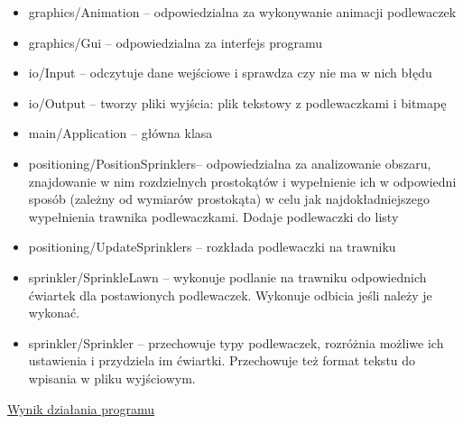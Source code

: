 \documentclass[12pt]{article}
\renewcommand{\_}{\kern-1.5pt\textunderscore\kern-1.5pt}
\begin{document}
\begin{itemize}
	\item graphics/Animation – odpowiedzialna za wykonywanie animacji podlewaczek\par

	\item graphics/Gui – odpowiedzialna za interfejs programu\par

	\item io/Input – odczytuje dane wejściowe i sprawdza czy nie ma w nich błędu\par

	\item io/Output – tworzy pliki wyjścia: plik tekstowy z podlewaczkami i bitmapę\par

	\item main/Application – główna klasa
\end{itemize}\par

\begin{itemize}
	\item positioning/PositionSprinklers– odpowiedzialna za analizowanie obszaru, znajdowanie w nim rozdzielnych prostokątów i wypełnienie ich w odpowiedni sposób (zależny od wymiarów prostokąta) w celu jak najdokładniejszego wypełnienia trawnika podlewaczkami. Dodaje podlewaczki do listy\par

	\item positioning/UpdateSprinklers – rozkłada podlewaczki na trawniku\par

	\item sprinkler/SprinkleLawn – wykonuje podlanie na trawniku odpowiednich ćwiartek dla postawionych podlewaczek. Wykonuje odbicia jeśli należy je wykonać.\par

	\item sprinkler/Sprinkler – przechowuje typy podlewaczek, rozróżnia możliwe ich ustawienia i przydziela im ćwiartki. Przechowuje też format tekstu do wpisania w pliku wyjściowym.
\end{itemize}\par


\vspace{\baselineskip}

\vspace{\baselineskip}
{\fontsize{16pt}{19.2pt}\selectfont \uline{Wynik działania programu}\par}\par
\end{document}
